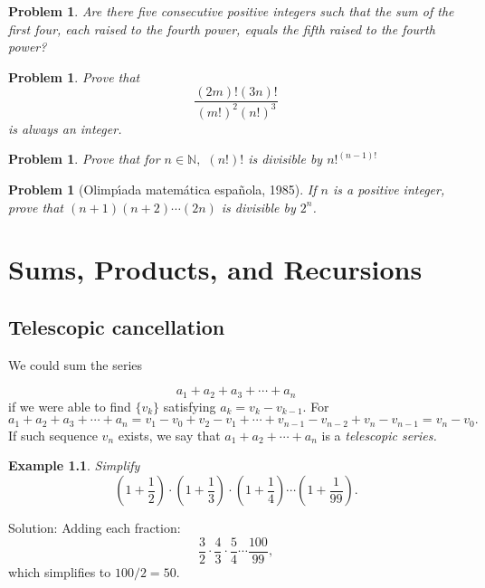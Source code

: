 \documentclass[11pt, openany]{book}
\theoremstyle{change} \theoremheaderfont{\blue\sffamily\bfseries}
\newtheorem{exa}[thm]{Example}
\newtheorem{pro}[thm]{Problem}
\theoremstyle{nonumberplain} \theoremheaderfont{\sffamily\bfseries}
\newcommand{\BBN}{\mathbb{N}}
\newcommand{\í}{\'{\i}}
\begin{document}
\begin{multicols}{2}
\begin{pro}Are there five consecutive positive integers such that the sum of the first
four, each raised to the fourth power, equals the fifth raised to
the fourth power?\end{pro}
\begin{pro} Prove that $$ \frac{(2m)!(3n)!}{(m!)^2 (n!)^3}$$is always an integer.\end{pro}

\begin{pro} Prove that for $n \in \BBN ,$ $(n!)!$ is divisible by $n!^{(n - 1)!}$\end{pro}
\begin{pro}[Olimp\'{\i}ada matem\'{a}tica espa\~{n}ola, 1985]
If $n$ is a positive integer, prove that $(n + 1)(n + 2)\cdots
(2n)$  is divisible by $2^n$.\end{pro}
\end{multicols}
\chapter{Sums, Products, and Recursions}
\section{Telescopic cancellation} We could sum the series

$$a_1 + a_2 + a_3 + \cdots + a_n$$
if we were able to find $\{v_k\}$ satisfying $a_k = v_k - v_{k -
1}.$ For
$$a_1 + a_2 + a_3 + \cdots + a_n = v_1 - v_0 + v_2 - v_1 + \cdots + v_{n - 1} - v_{n - 2}
+ v_n - v_{n - 1} = v_n - v_0.$$ If such sequence $v_n$ exists, we
say that
 $a_1+ a_2 + \cdots + a_n$  is a {\em telescopic series.}


\begin{exa} Simplify
$$ \left( 1 + \frac{1}{2}\right) \cdot \left( 1 + \frac{1}{3}\right) \cdot
\left( 1 + \frac{1}{4}\right) \cdots \left( 1 +
\frac{1}{99}\right) . $$
\end{exa}
Solution: Adding each fraction:
$$\frac{3}{2} \cdot \frac{4}{3}\cdot\frac{5}{4}\cdots\frac{100}{99}, $$ which simplifies to
$100/2 = 50.$
\end{document}
